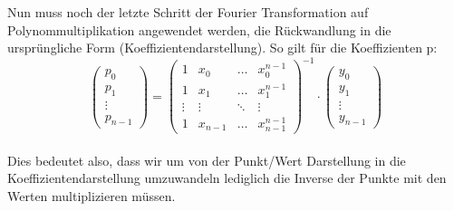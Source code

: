 \documentclass[
../../AuD-Zusammenfassung.tex,
]
{subfiles}
\begin{document}
Nun muss noch der letzte Schritt der Fourier Transformation auf Polynommultiplikation angewendet werden, die Rückwandlung in die ursprüngliche Form (Koeffizientendarstellung). So gilt für die Koeffizienten p:\\
\[
\begin{pmatrix}
    p_0 \\
    p_1 \\
    \vdots \\
    p_{n-1}
\end{pmatrix}
=
\begin{pmatrix}
    1 & x_0 & \ldots & x_0^{n-1} \\
    1 & x_1 & \ldots & x_1^{n-1} \\
    \vdots & \vdots & \ddots & \vdots \\
    1 & x_{n-1} & \ldots & x_{n-1}^{n-1} 
\end{pmatrix}^{-1}
\cdot 
\begin{pmatrix}
    y_0 \\
    y_1 \\
    \vdots \\
    y_{n-1}
\end{pmatrix}
\]\\
Dies bedeutet also, dass wir um von der Punkt/Wert Darstellung in die Koeffizientendarstellung umzuwandeln lediglich die Inverse der Punkte mit den Werten multiplizieren müssen.
\end{document}

